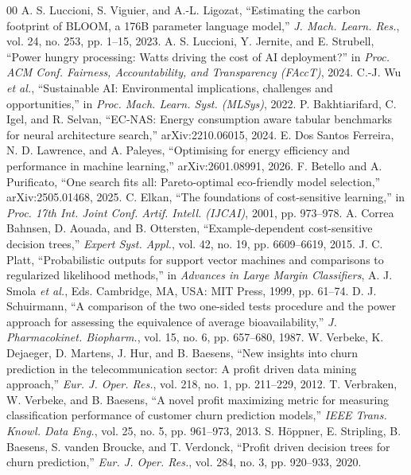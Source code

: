 \documentclass[conference]{IEEEtran}
\begin{document}
\begin{thebibliography}{00}
 A. S. Luccioni, S. Viguier, and A.-L. Ligozat, ``Estimating the carbon footprint of BLOOM, a 176B parameter language model,'' \emph{J. Mach. Learn. Res.}, vol. 24, no. 253, pp. 1--15, 2023.
 A. S. Luccioni, Y. Jernite, and E. Strubell, ``Power hungry processing: Watts driving the cost of AI deployment?'' in \emph{Proc. ACM Conf. Fairness, Accountability, and Transparency (FAccT)}, 2024.
 C.-J. Wu \emph{et al.}, ``Sustainable AI: Environmental implications, challenges and opportunities,'' in \emph{Proc. Mach. Learn. Syst. (MLSys)}, 2022.
 P. Bakhtiarifard, C. Igel, and R. Selvan, ``EC-NAS: Energy consumption aware tabular benchmarks for neural architecture search,'' arXiv:2210.06015, 2024.
 E. Dos Santos Ferreira, N. D. Lawrence, and A. Paleyes, ``Optimising for energy efficiency and performance in machine learning,'' arXiv:2601.08991, 2026.
 F. Betello and A. Purificato, ``One search fits all: Pareto-optimal eco-friendly model selection,'' arXiv:2505.01468, 2025.
 C. Elkan, ``The foundations of cost-sensitive learning,'' in \emph{Proc. 17th Int. Joint Conf. Artif. Intell. (IJCAI)}, 2001, pp. 973--978.
 A. Correa Bahnsen, D. Aouada, and B. Ottersten, ``Example-dependent cost-sensitive decision trees,'' \emph{Expert Syst. Appl.}, vol. 42, no. 19, pp. 6609--6619, 2015.
 J. C. Platt, ``Probabilistic outputs for support vector machines and comparisons to regularized likelihood methods,'' in \emph{Advances in Large Margin Classifiers}, A. J. Smola \emph{et al.}, Eds. Cambridge, MA, USA: MIT Press, 1999, pp. 61--74.
 D. J. Schuirmann, ``A comparison of the two one-sided tests procedure and the power approach for assessing the equivalence of average bioavailability,'' \emph{J. Pharmacokinet. Biopharm.}, vol. 15, no. 6, pp. 657--680, 1987.
 W. Verbeke, K. Dejaeger, D. Martens, J. Hur, and B. Baesens, ``New insights into churn prediction in the telecommunication sector: A profit driven data mining approach,'' \emph{Eur. J. Oper. Res.}, vol. 218, no. 1, pp. 211--229, 2012.
 T. Verbraken, W. Verbeke, and B. Baesens, ``A novel profit maximizing metric for measuring classification performance of customer churn prediction models,'' \emph{IEEE Trans. Knowl. Data Eng.}, vol. 25, no. 5, pp. 961--973, 2013.
 S. H\"oppner, E. Stripling, B. Baesens, S. vanden Broucke, and T. Verdonck, ``Profit driven decision trees for churn prediction,'' \emph{Eur. J. Oper. Res.}, vol. 284, no. 3, pp. 920--933, 2020.

\end{thebibliography}
\end{document}
